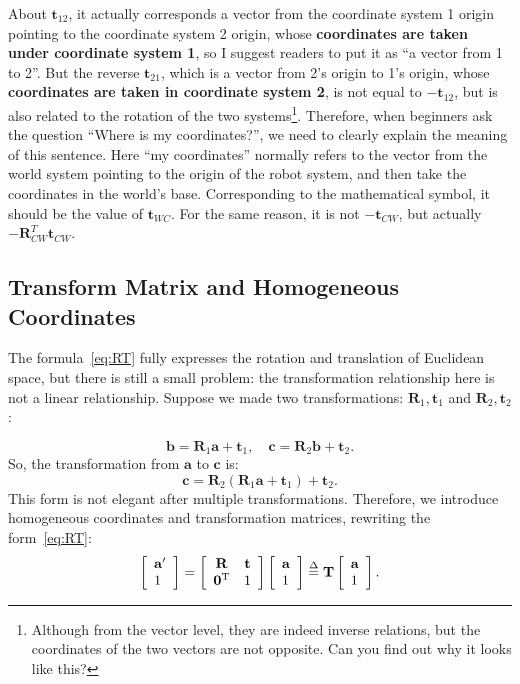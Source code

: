 About $\mathbf{t}_{12}$, it actually corresponds a vector from the coordinate system 1 origin pointing to the coordinate system 2 origin, whose \textbf{coordinates are taken under coordinate system 1}, so I suggest readers to put it as ``a vector from 1 to 2''. But the reverse $ \mathbf{t}_{21} $, which is a vector from 2's origin to 1's origin, whose \textbf{coordinates are taken in coordinate system 2}, is not equal to $-\mathbf{t}_{12}$, but is also related to the rotation of the two systems\footnote{Although from the vector level, they are indeed inverse relations, but the coordinates of the two vectors are not opposite. Can you find out why it looks like this? }. Therefore, when beginners ask the question ``Where is my coordinates?'', we need to clearly explain the meaning of this sentence. Here ``my coordinates'' normally refers to the vector from the world system pointing to the origin of the robot system, and then take the coordinates in the world's base. Corresponding to the mathematical symbol, it should be the value of $ \mathbf{t}_{WC} $. For the same reason, it is not $ - \mathbf {t}_{CW}$, but actually $-\mathbf{R}_{CW}^T \mathbf{t}_{CW}$.

\subsection{Transform Matrix and Homogeneous Coordinates}
The formula~\eqref{eq:RT} fully expresses the rotation and translation of Euclidean space, but there is still a small problem: the transformation relationship here is not a linear relationship. Suppose we made two transformations: $ \mathbf {R}_ 1, \mathbf {t}_ 1 $ and $ \mathbf {R}_ 2, \mathbf {t}_ 2 $:

\[
\mathbf{b} = {\mathbf{R}_1} \mathbf{a} + {\mathbf{t}_1}, \quad \mathbf{c} = {\mathbf{R}_2} \mathbf{b} + {\mathbf{t}_2}.
\]
So, the transformation from $ \mathbf{a} $ to $ \mathbf{c} $ is:
\[
\mathbf{c} = {\mathbf{R}_2}\left( {{\mathbf{R}_1} \mathbf{a} + {\mathbf{t}_1}} \right) + {\mathbf{t}_2}.
\]
This form is not elegant after multiple transformations. Therefore, we introduce homogeneous coordinates and transformation matrices, rewriting the form~\eqref{eq:RT}:
\begin{equation}
\left[\begin{array}{l} 
\mathbf {a} ' \\
1
\end{array} \right] = 
\left[ {\begin{array}{*{20}{c}}
    \mathbf{R}&\mathbf{t}\\
    {{\mathbf{0}^\mathrm{T}}}&1
    \end{array}} \right]
\left[ \begin{array}{l}
\mathbf {a} \\
1
\end{array} \right]  \buildrel \Delta \over = \mathbf{T} \left[ \begin{array}{l}
\mathbf {a} \\
1
\end{array} \right].
\end{equation}

